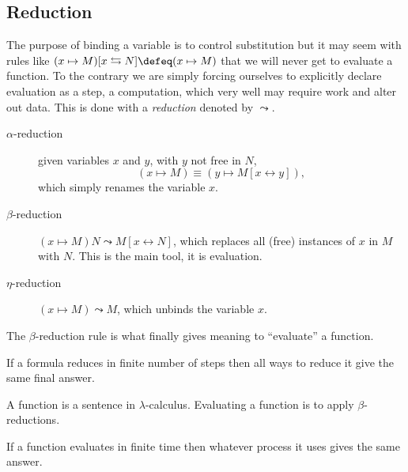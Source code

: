 \subsection{Reduction}
The purpose of binding a variable is to control substitution but it may seem 
with rules like $(x\mapsto M)[x\leftrightarrows N]\defeq (x\mapsto M)$ that 
we will never get to evaluate a function.  To the contrary we are simply forcing 
ourselves to explicitly declare evaluation as a step, a computation, which 
very well may require work and alter out data.  This is done with a \emph{reduction}
denoted by $\leadsto$.
\begin{description}
    \item[$\alpha$-reduction] given variables $x$ and $y$, with $y$ not free in $N$,
    \[(x\mapsto M)\equiv (y\mapsto M[x\leftrightarrow y]),\]
    which simply renames the variable $x$.

    \item[$\beta$-reduction]
    $(x\mapsto M)N\leadsto M[x\leftrightarrow N]$, which replaces all (free)
    instances of $x$ in $M$ with $N$.  This is the main tool, it is evaluation.
    
    \item[$\eta$-reduction]
    $(x\mapsto M)\leadsto M$, which unbinds the variable $x$.
\end{description}

The $\beta$-reduction rule is what finally gives meaning to ``evaluate'' a function.

\begin{theorem}
    If a formula reduces in finite number of steps then all ways to reduce it give the same 
    final answer.
\end{theorem}


\begin{definition}
    A function is a sentence in $\lambda$-calculus.
    Evaluating a function is to apply $\beta$-reductions.
\end{definition}

\begin{corollary}
    If a function evaluates in finite time then whatever process it uses 
    gives the same answer.
\end{corollary}

